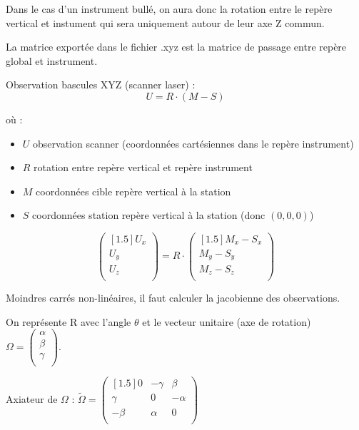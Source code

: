 \documentclass[french]{report}
\begin{document}
Dans le cas d'un instrument bullé, on aura donc la rotation entre le repère vertical et instument qui sera uniquement autour de leur axe Z commun.

La matrice exportée dans le fichier .xyz est la matrice de passage entre repère global et instrument.



Observation bascules XYZ (scanner laser) :
$$U=R \cdot (M - S)$$

où :
\begin{itemize}
\item $U$ observation scanner (coordonnées cartésiennes dans le repère instrument)
\item $R$ rotation entre repère vertical et repère instrument
\item $M$ coordonnées cible repère vertical à la station
\item $S$ coordonnées station repère vertical à la station (donc $(0,0,0)$)
\end{itemize}

$$ \begin{pmatrix}[1.5] U_x \\ U_y \\ U_z \\ \end{pmatrix}
= R \cdot
\begin{pmatrix}[1.5] M_x - S_x \\ M_y - S_y \\ M_z - S_z \\ \end{pmatrix} $$

Moindres carrés non-linéaires, il faut calculer la jacobienne des observations.

On représente R avec l'angle $\theta$ %
et le vecteur unitaire (axe de rotation) $\Omega= \begin{pmatrix} \alpha  \\ \beta \\  \gamma \\ \end{pmatrix}$.

Axiateur de $\Omega$ :
$\tilde{\Omega}=\begin{pmatrix}[1.5] 0 & -\gamma & \beta \\ \gamma & 0 & -\alpha \\ -\beta & \alpha & 0 \\ \end{pmatrix}$
\end{document}
